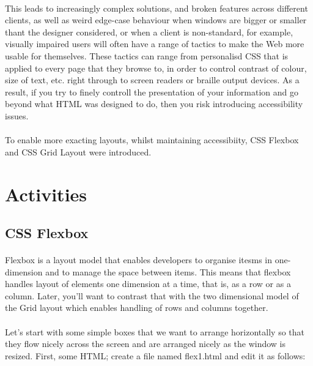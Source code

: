 \documentclass[10pt, a4paper, twosize]{article}
\begin{document}
\paragraph{} This leads to increasingly complex solutions, and broken features across different clients, as well as weird edge-case behaviour when windows are bigger or smaller thant the designer considered, or when a client is non-standard, for example, visually impaired users will often have a range of tactics to make the Web more usable for themselves. These tactics can range from personalisd CSS that is applied to every page that they browse to, in order to control contrast of colour, size of text, etc. right through to screen readers or braille output devices. As a result, if you try to finely controll the presentation of your information and go beyond what HTML was designed to do, then you risk introducing accessibility issues.

\paragraph{} To enable more exacting layouts, whilst maintaining accessibiity, CSS Flexbox and CSS Grid Layout were introduced. 

\section*{Activities}

\subsection*{CSS Flexbox}
\paragraph{} Flexbox is a layout model that enables developers to organise itesms in one-dimension and to manage the space between items. This means that flexbox handles layout of elements one dimension at a time, that is, as a row or as a column. Later, you'll want to contrast that with the two dimensional model of the Grid layout which enables handling of rows and columns together.

\paragraph{} Let's start with some simple boxes that we want to arrange horizontally so that they flow nicely across the screen and are arranged nicely as the window is resized. First, some HTML; create a file named flex1.html and edit it as follows:
\end{document}
